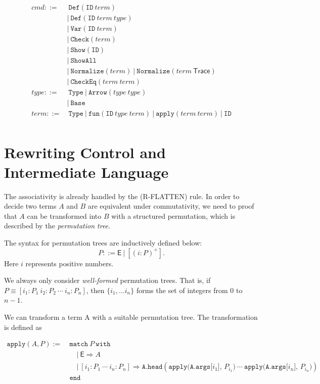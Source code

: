 \documentclass{article}
\begin{document}
\begin{align*}
    cmd ::=&\ \texttt{Def}(\texttt{ID}\ term) \\
        &|\ \texttt{Def}(\texttt{ID}\ term\ type) \\
        &|\ \texttt{Var}(\texttt{ID}\ term) \\
        &|\ \texttt{Check}(term) \\
        &|\ \texttt{Show}(\texttt{ID}) \\
        &|\ \texttt{ShowAll} \\
        &|\ \texttt{Normalize}(term)\ |\ \texttt{Normalize}(term\ \textsf{Trace}) \\
        &|\ \texttt{CheckEq}(term\ term) \\
    type ::=&\ \texttt{Type}\ |\ \texttt{Arrow}(type\ type) \\
            &|\ \texttt{Base} \\
    term ::=&\ \texttt{Type}\ |\ \texttt{fun}(\texttt{ID}\ type\ term)\ |\ \texttt{apply}(term\ term)\ |\ \texttt{ID} \\
\end{align*}


\section{Rewriting Control and Intermediate Language}
The associativity is already handled by the (R-FLATTEN) rule. In order to decide two terms $A$ and $B$ are equivalent under commutativity, we need to proof that $A$ can be transformed into $B$ with a structured permutation, which is described by the \textit{permutation tree}.

\begin{definition}
    The syntax for permutation trees are inductively defined below:
    \[
    P ::= \mathsf{E}\ |\ [(i:P)^+].
    \]
    Here $i$ represents positive numbers.
\end{definition}
We always only consider \textit{well-formed} permutation trees. That is, if $P \equiv [i_1:P_1\ i_2:P_2\ \cdots\ i_n:P_n]$, then $\{i_1, ... i_n\}$ forms the set of integers from $0$ to $n-1$.

We can transform a term A with a suitable permutation tree. The transformation is defined as

\begin{align*}
    \texttt{apply}(A, P) :=\ & \texttt{match}\ P\ \texttt{with} \\
    & \quad |\ \textsf{E} \Rightarrow A \\
    & \quad |\ [i_1:P_1\ \cdots\ i_n:P_n] \Rightarrow \texttt{A.head}(\texttt{apply(A.args[$i_1$], $P_{i_1}$)}\ \cdots\ \texttt{apply(A.args[$i_n$], $P_{i_n}$)}) \\
    & \texttt{end}
\end{align*}

\clearpage



\clearpage



\end{document}
